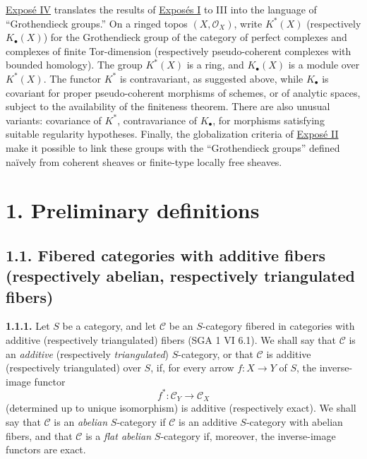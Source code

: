 \hyperlink{sga6.e04.expose}{Exposé IV} translates the results of \hyperlink{sga6.e01.expose}{Exposés I} to III into the language of ``Grothendieck groups.'' On a ringed topos \((X,\mathcal O_X)\), write \(K^*(X)\) (respectively \(K_\bullet(X)\)) for the Grothendieck group of the category of perfect complexes and complexes of finite Tor-dimension (respectively pseudo-coherent complexes with bounded homology). The group \(K^*(X)\) is a ring, and \(K_\bullet(X)\) is a module over \(K^*(X)\). The functor \(K^*\) is contravariant, as suggested above, while \(K_\bullet\) is covariant for proper pseudo-coherent morphisms of schemes, or of analytic spaces, subject to the availability of the finiteness theorem. There are also unusual variants: covariance of \(K^*\), contravariance of \(K_\bullet\), for morphisms satisfying suitable regularity hypotheses. Finally, the globalization criteria of \hyperlink{sga6.e02.expose}{Exposé II} make it possible to link these groups with the ``Grothendieck groups'' defined naïvely from coherent sheaves or finite-type locally free sheaves.

\section*{1. Preliminary definitions}

\subsection*{1.1. Fibered categories with additive fibers (respectively abelian, respectively triangulated fibers)}

\textbf{1.1.1.} Let \(S\) be a category, and let \(\mathcal C\) be an \(S\)-category fibered in categories with additive (respectively triangulated) fibers (SGA 1 VI 6.1). We shall say that \(\mathcal C\) is an \emph{additive} (respectively \emph{triangulated}) \(S\)-category, or that \(\mathcal C\) is additive (respectively triangulated) over \(S\), if, for every arrow \(f:X\to Y\) of \(S\), the inverse-image functor
\[
  f^*:\mathcal C_Y\longrightarrow \mathcal C_X
\]
(determined up to unique isomorphism) is additive (respectively exact). We shall say that \(\mathcal C\) is an \emph{abelian} \(S\)-category if \(\mathcal C\) is an additive \(S\)-category with abelian fibers, and that \(\mathcal C\) is a \emph{flat abelian} \(S\)-category if, moreover, the inverse-image functors are exact.

